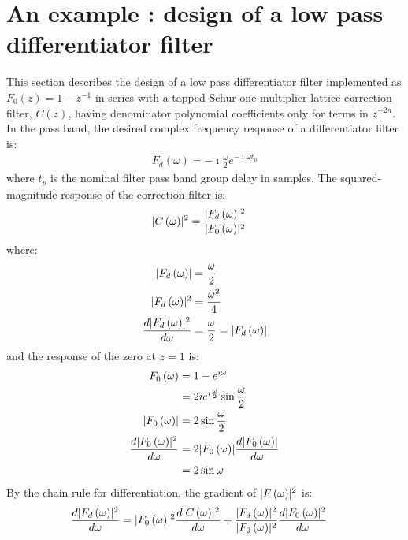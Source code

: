 \documentclass[a4paper,twoside,10pt,english]{article}
\DeclarePairedDelimiter{\mathabs}{\lvert}{\rvert}
\begin{document}
\section{An example : design of a low pass differentiator filter}
This section describes the design of a low pass differentiator filter
implemented as $F_{0}\left(z\right)=1-z^{-1}$ in series with a tapped Schur
one-multiplier lattice correction filter, $C\left(z\right)$, having denominator
polynomial coefficients only for terms in $z^{-2n}$. In the pass band, the
desired complex frequency response of a differentiator filter is:
\begin{align*}
  F_{d}\left(\omega\right)=-\imath\frac{\omega}{2}e ^{-\imath\omega t_{p}}
\end{align*}
where $t_{p}$ is the nominal filter pass band group delay in samples.
The squared-magnitude response of the correction filter is:
\begin{align*}
  \mathabs{C\left(\omega\right)}^{2}
  &= \frac{\mathabs{F_{d}\left(\omega\right)}^{2}}
    {\mathabs{F_{0}\left(\omega\right)}^{2}}
\end{align*}
where:
\begin{align*}
  \mathabs{F_{d}\left(\omega\right)} &= \frac{\omega}{2} \\
  \mathabs{F_{d}\left(\omega\right)}^{2}&= \frac{\omega^{2}}{4} \\  
  \frac{d\mathabs{F_{d}\left(\omega\right)}^{2}}{d\omega}
     &= \frac{\omega}{2} = \mathabs{F_{d}\left(\omega\right)}
\end{align*}
and the response of the zero at $z=1$ is:
\begin{align*}
  F_{0}\left(\omega\right) &= 1-e^{\imath\omega} \\
        &=2\imath{} e^{\imath\frac{\omega}{2}}\sin\frac{\omega}{2} \\
  \mathabs{F_{0}\left(\omega\right)} &= 2\sin\frac{\omega}{2} \\
  \frac{d\mathabs{F_{0}\left(\omega\right)}^{2}}{d\omega}
        &=2\mathabs{F_{0}\left(\omega\right)}
          \frac{d\mathabs{F_{0}\left(\omega\right)}}{d\omega} \\
        &= 2\sin\omega
\end{align*}
By the chain rule for differentiation, the gradient of
$\mathabs{F\left(\omega\right)}^{2}$ is:
\begin{align*}
  \frac{d\mathabs{F_{d}\left(\omega\right)}^{2}}{d\omega}
  &= \mathabs{F_{0}\left(\omega\right)}^{2}
     \frac{d\mathabs{C\left(\omega\right)}^{2}}{d\omega} +
    \frac{\mathabs{F_{d}\left(\omega\right)}^{2}}
    {\mathabs{F_{0}\left(\omega\right)}^{2}}
    \frac{d\mathabs{F_{0}\left(\omega\right)}^{2}}{d\omega}
\end{align*}
\end{document}
